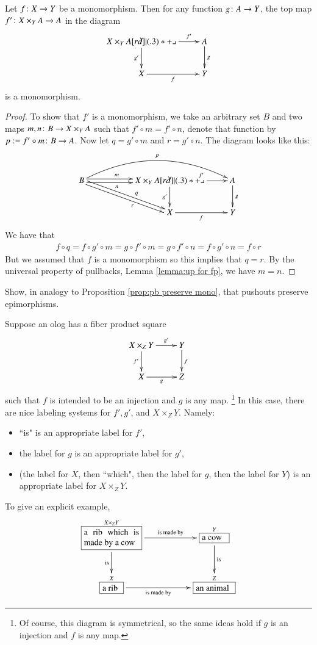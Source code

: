 \begin{proposition}\label{prop:pb preserve mono}

Let $f\colon X\rightarrow Y$ be a monomorphism. Then for any function $g\colon A\rightarrow Y$, the top map $f'\colon X\times_YA\rightarrow A$ in the diagram
$$
\xymatrix{X\times_YA\ar[r]^-{f'}\ar[d]_{g'}\ullimit&A\ar[d]^g\\X\ar[r]_f&Y}
$$
is a monomorphism.

\end{proposition}

\begin{proof}

To show that $f'$ is a monomorphism, we take an arbitrary set $B$ and two maps $m,n\colon B\rightarrow X\times_YA$ such that $f'\circ m=f'\circ n$, denote that function by $p:=f'\circ m\colon B\rightarrow A$. Now let $q=g'\circ m$ and $r=g'\circ n$. The diagram looks like this:
$$
\xymatrix{B\ar@<.5ex>[rr]^(.4)m\ar@<-.5ex>[rr]_(.4)n\ar@/^2pc/[rrr]^p\ar@<.5ex>[drr]^(.6)q\ar@<-.5ex>[drr]_(.6)r&&X\times_YA\ar[r]^{f'}\ar[d]_{g'}\ullimit&A\ar[d]^g\\&&X\ar[r]_f&Y}
$$
We have that 
\begin{align*}f\circ q=f\circ g'\circ m=g\circ f'\circ m=g\circ f'\circ n=f\circ g'\circ n=f\circ r\end{align*} 
But we assumed that $f$ is a monomorphism so this implies that $q=r$. By the universal property of pullbacks, Lemma \ref{lemma:up for fp}, we have $m=n$.

\end{proof}

\begin{exercise}
Show, in analogy to Proposition \ref{prop:pb preserve mono}, that pushouts preserve epimorphisms.
\end{exercise}

\begin{example}\label{exc:olog pullbacks}

Suppose an olog has a fiber product square
$$\xymatrix{X\times_ZY\ar[r]^-{g'}\ar[d]_{f'}&Y\ar[d]^f\\X\ar[r]_g&Z}$$ such that $f$ is intended to be an injection and $g$ is any map.
\footnote{Of course, this diagram is symmetrical, so the same ideas hold if $g$ is an injection and $f$ is any map.} 
In this case, there are nice labeling systems for $f', g'$, and $X\times_ZY$. Namely:
\begin{itemize}
\item ``is" is an appropriate label for $f'$, 
\item the label for $g$ is an appropriate label for $g'$,
\item (the label for $X$, then ``which", then the label for $g$, then the label for $Y$) is an appropriate label for $X\times_ZY$.
\end{itemize}

To give an explicit example, 
$$\xymatrix{
\obox{X\times_ZY}{.9in}{a rib which is made by a cow}\LA{rr}{is made by}\LAL{d}{is}&&\obox{Y}{.4in}{a cow}\LA{d}{is}\\
\obox{X}{.3in}{a rib}\LAL{rr}{is made by}&&\obox{Z}{.6in}{an animal}
}
$$

\end{example}


